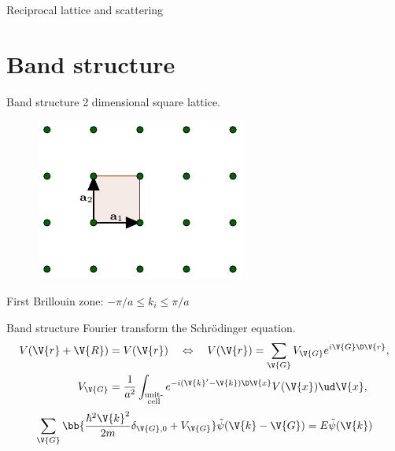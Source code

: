 \documentclass{beamer}
\begin{document}
\begin{frame}{Reciprocal lattice and scattering}
\end{frame}



\section{Band structure}
\begin{frame}{Band structure}
	2 dimensional square lattice.
	\begin{figure}[H]
		\centering
		\includegraphics[width=0.5\linewidth]{figures/squareUnit.pdf}
		\label{fig:band_structure_lattice}
	\end{figure}
	First Brillouin zone: $ -\pi/a \leq k_i \leq \pi/a $
\end{frame}


\begin{frame}{Band structure}
Fourier transform the Schrödinger equation.
\begin{align*}\label{key}
	V(\V{r}+\V{R}) &= V(\V{r}) \quad \Leftrightarrow \quad V(\V{r}) = \sum_{\V{G}} V_{\V{G}} e^{i\V{G} \D \V{r}},\\
	V_{\V{G}} &= \frac{1}{a^2}\int_{\substack{\text{unit-} \\\text{cell}}} e^{-i (\V{k}'-\V{k}) \D \V{x}} V(\V{x}) \ud \V{x},
\end{align*}
\begin{equation*}\label{key}
	\sum_{\V{G}} \bb{\frac{\hbar^2 \V{k}^2}{2m} \delta_{\V{G},0} + V_{\V{G}} } \tilde{\psi}(\V{k}-\V{G}) = E \tilde{\psi} (\V{k})
\end{equation*}
\end{frame}
\end{document}
